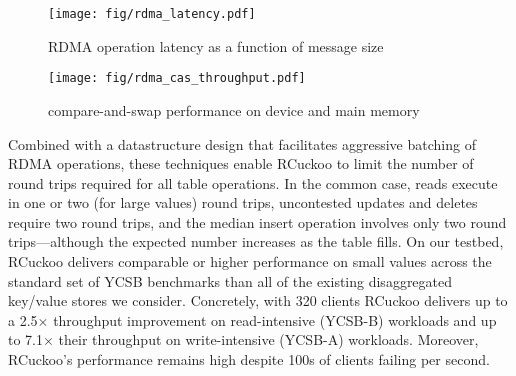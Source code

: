 \begin{figure}
        \texttt{[image: fig/rdma\_latency.pdf]}
        \caption{RDMA operation latency as a function of message size~\cite{rdma-latency}}
        \label{fig:rdma-benchmarks-b}
\end{figure}

\begin{figure}
        \texttt{[image: fig/rdma\_cas\_throughput.pdf]}
        \caption{compare-and-swap performance on device and main memory}
        \label{fig:rdma-benchmarks-c}
\end{figure}

Combined with a datastructure design that facilitates aggressive
batching of RDMA operations, these techniques enable RCuckoo to limit
the number of round trips required for all table operations.  In the
common case, reads execute in one or two (for large values) round
trips, uncontested updates and deletes require two round trips, and
the median insert operation involves only two round trips---although
the expected number increases as the table fills.  On our testbed,
RCuckoo delivers comparable or higher performance on small values across the standard set  of YCSB benchmarks than all of the existing disaggregated
key/value stores we consider.  Concretely, with 320 clients RCuckoo
delivers up to a 2.5$\times$ throughput improvement on read-intensive
(YCSB-B) workloads and up to 7.1$\times$ their throughput on
write-intensive (YCSB-A) workloads.  Moreover, RCuckoo's
performance remains high despite 100s of
clients failing per second.
